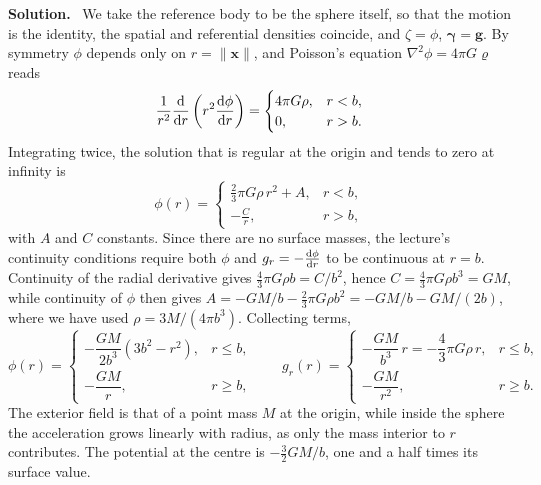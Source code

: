 \documentclass[a4paper,12pt]{paper}
\newenvironment{solution}{\par\noindent\textbf{Solution.}\ }{\par\medskip}
\begin{document}
\begin{solution}
We take the reference body to be the sphere itself, so that the motion is the identity, the spatial
and referential densities coincide, and $\zeta=\phi$, $\bm{\gamma}=\mathbf{g}$. By symmetry $\phi$
depends only on $r=\|\mathbf{x}\|$, and Poisson's equation $\nabla^{2}\phi=4\pi G\varrho$ reads
\begin{equation}
\frac{1}{r^{2}}\frac{\mathrm{d}}{\mathrm{d} r}\left(r^{2}\frac{\mathrm{d}\phi}{\mathrm{d} r}\right)=
\begin{cases}
4\pi G\rho, & r<b,\\
0, & r>b.
\end{cases}
\label{eq:1}
\end{equation}
Integrating twice, the solution that is regular at the origin and tends to zero at infinity is
\begin{equation}
\phi(r)=
\begin{cases}
\frac{2}{3}\pi G\rho\,r^{2}+A, & r<b,\\
-\frac{C}{r}, & r>b,
\end{cases}
\label{eq:2}
\end{equation}
with $A$ and $C$ constants. Since there are no surface masses, the lecture's continuity conditions
require both $\phi$ and $g_{r}=-\frac{\mathrm{d}\phi}{\mathrm{d} r}$ to be continuous at $r=b$. Continuity of
the radial derivative gives $\frac{4}{3}\pi G\rho b=C/b^{2}$, hence $C=\frac{4}{3}\pi G\rho b^{3}=GM$,
while continuity of $\phi$ then gives $A=-GM/b-\frac{2}{3}\pi G\rho b^{2}=-GM/b-GM/(2b)$, where we have
used $\rho=3M/(4\pi b^{3})$. Collecting terms,
\begin{equation}
\phi(r)=
\begin{cases}
-\dfrac{GM}{2b^{3}}\left(3b^{2}-r^{2}\right), & r\le b,\\[8pt]
-\dfrac{GM}{r}, & r\ge b,
\end{cases}
\qquad
g_{r}(r)=
\begin{cases}
-\dfrac{GM}{b^{3}}\,r=-\dfrac{4}{3}\pi G\rho\,r, & r\le b,\\[8pt]
-\dfrac{GM}{r^{2}}, & r\ge b.
\end{cases}
\label{eq:3}
\end{equation}
The exterior field is that of a point mass $M$ at the origin, while inside the sphere the
acceleration grows linearly with radius, as only the mass interior to $r$ contributes. The potential
at the centre is $-\frac{3}{2}GM/b$, one and a half times its surface value.


\end{solution}
\end{document}
